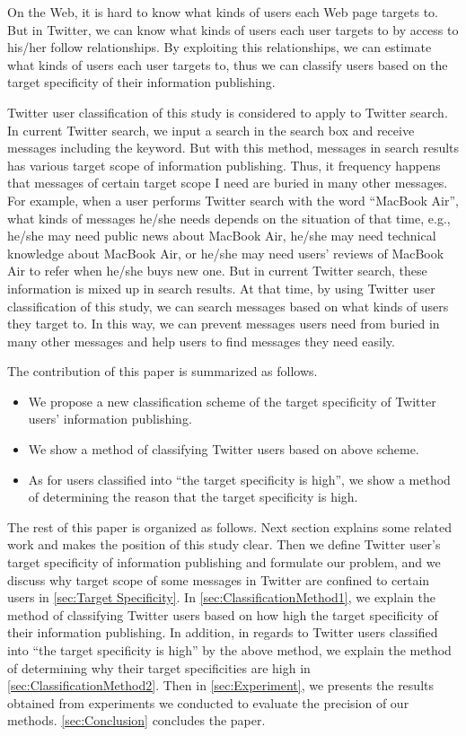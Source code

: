 On the Web, it is hard to know what kinds of users each Web page targets
to.  But in Twitter, we can know what kinds of users each user targets
to by access to his/her follow relationships.  By exploiting this
relationships, we can estimate what kinds of users each user targets to,
thus we can classify users based on the target specificity of their
information publishing.

Twitter user classification of this study is considered to apply to
Twitter search.  In current Twitter search, we input a search in the
search box and receive messages including the keyword.  But with this
method, messages in search results has various target scope of
information publishing.  Thus, it frequency happens that messages of
certain target scope I need are buried in many other messages. For
example, when a user performs Twitter search with the word ``MacBook
Air'', what kinds of messages he/she needs depends on the situation of
that time, e.g., he/she may need public news about MacBook Air, he/she
may need technical knowledge about MacBook Air, or he/she may need
users' reviews of MacBook Air to refer when he/she buys new one.  But in
current Twitter search, these information is mixed up in search results.
At that time, by using Twitter user classification of this study, we can
search messages based on what kinds of users they target to.  In this
way, we can prevent messages users need from buried in many other
messages and help users to find messages they need easily.

The contribution of this paper is summarized as follows.

\begin{itemize}
\item We propose a new classification scheme of the target specificity
      of Twitter users' information publishing.
\item We show a method of classifying Twitter users based on above
      scheme.
\item As for users classified into ``the target specificity is high'',
      we show a method of determining the reason that the target
      specificity is high.
\end{itemize}

The rest of this paper is organized as follows.  Next section explains
some related work and makes the position of this study clear.  Then we
define Twitter user's target specificity of information publishing and
formulate our problem, and we discuss why target scope of some messages
in Twitter are confined to certain users in \ref{sec:Target
Specificity}.  In \ref{sec:ClassificationMethod1}, we explain the method
of classifying Twitter users based on how high the target specificity of
their information publishing.  In addition, in regards to Twitter users
classified into  ``the target specificity is high'' by the above method,
we explain the method of determining why their target specificities are
high in \ref{sec:ClassificationMethod2}.  Then in \ref{sec:Experiment},
we presents the results obtained from experiments we conducted to
evaluate the precision of our methods.  \ref{sec:Conclusion} concludes
the paper.

